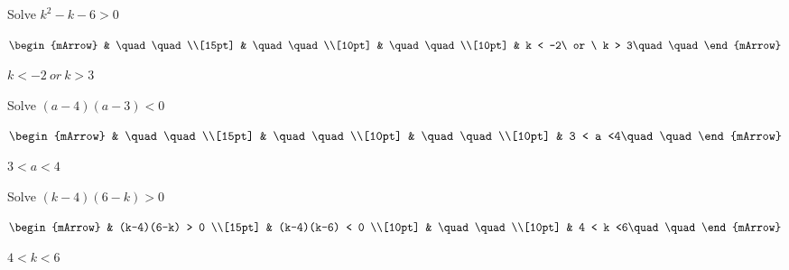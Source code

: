 \begin{mtask}[resume]
\begin{exercise}
\begin{envSolution}
           \end{envSolution}
         \end{exercise}
   \task \begin{exercise} Solve $k^2 - k - 6 > 0$
           \begin{envSolution}
             $\begin{mArrow} 
			       & \quad \quad              \\[15pt]
                   & \quad \quad              \\[10pt]
		   		   & \quad \quad              \\[10pt]
				   & k < -2\ or \ k > 3\quad \quad 
              \end{mArrow}$
            \begin{shortsolution}  
			     $k < -2\ or \ k > 3$
			\end{shortsolution}				 
           \end{envSolution}
         \end{exercise}
   \task \begin{exercise} Solve $(a-4)(a-3)< 0$
           \begin{envSolution}
             $\begin{mArrow} 
			       & \quad \quad              \\[15pt]
                   & \quad \quad              \\[10pt]
		   		   & \quad \quad              \\[10pt]
				   & 3 < a <4\quad \quad 
              \end{mArrow}$
            \begin{shortsolution}  
			     $3 < a < 4$
			\end{shortsolution}				 
           \end{envSolution}
         \end{exercise}

   \task \begin{exercise} Solve $(k-4)(6-k) > 0$
           \begin{envSolution}
             $\begin{mArrow} 
			       & (k-4)(6-k) > 0              \\[15pt]
                   & (k-4)(k-6) < 0              \\[10pt]
		   		   & \quad \quad                 \\[10pt]
				   & 4 < k <6\quad \quad 
              \end{mArrow}$
            \begin{shortsolution}  
			     $4 < k < 6$
			\end{shortsolution}				 
           \end{envSolution}
         \end{exercise}
\end{mtask}


